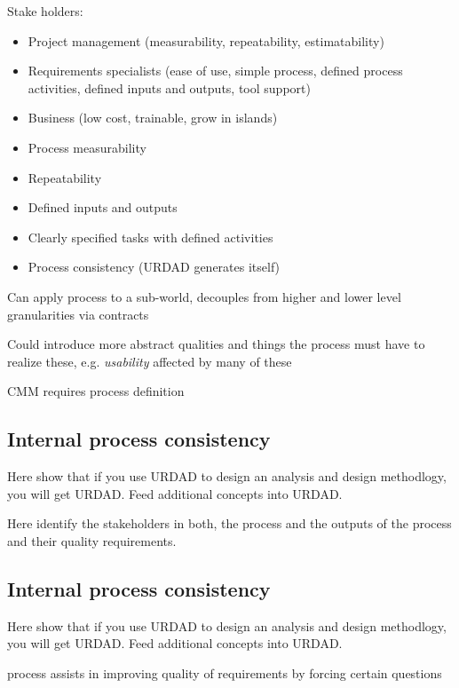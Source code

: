 Stake holders:
\begin{itemize}
  \item Project management (measurability, repeatability, estimatability)
  \item Requirements specialists (ease of use, simple process, defined process activities, defined inputs and outputs, tool support)
  \item Business (low cost, trainable, grow in islands)
\end{itemize}


\begin{itemize}
  \item Process measurability
  \item Repeatability
  \item Defined inputs and outputs
  \item Clearly specified tasks with defined activities
  \item Process consistency (URDAD generates itself)
\end{itemize}

Can apply process to a sub-world, decouples from higher and lower level granularities via contracts

Could introduce more abstract qualities and things the process must have to realize these, e.g. \emph{usability} affected by many of these

CMM requires process definition


\subsection{Internal process consistency}


Here show that if you use URDAD to design an analysis and design methodlogy, you will get URDAD. Feed additional concepts into URDAD.

Here identify the stakeholders in both, the process and the outputs of the process and their quality requirements.


\subsection{Internal process consistency}

Here show that if you use URDAD to design an analysis and design methodlogy, you will get URDAD. Feed additional concepts into URDAD.

process assists in improving quality of requirements by forcing certain questions
